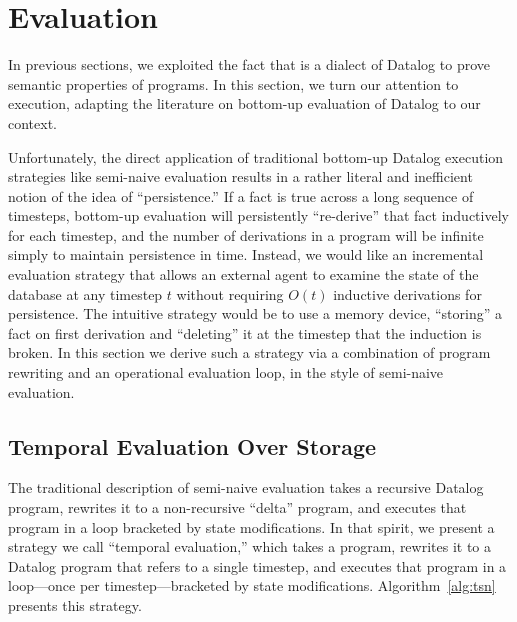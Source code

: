 \section{Evaluation}
In previous sections, we exploited the fact that \slang is a dialect of Datalog to prove semantic properties of \slang programs.  In this section, we turn our attention to execution, adapting the literature on bottom-up evaluation of Datalog to our context.

Unfortunately, the direct application of traditional bottom-up Datalog execution strategies like semi-naive evaluation results in a rather literal and inefficient notion of the idea of ``persistence.''  If a fact is true across a long sequence of timesteps, bottom-up evaluation will persistently ``re-derive'' that fact inductively for each timestep, and the number of derivations in a program will be infinite simply to maintain persistence in time.  Instead, we would like an incremental evaluation strategy that allows an external agent to examine the state of the database at any timestep $t$ without requiring $O(t)$ inductive derivations for persistence.  The intuitive strategy would be to use a memory device, ``storing'' a fact on first derivation and ``deleting'' it at the timestep that the induction is broken.  In this section we derive such a strategy via a combination of program rewriting and an operational evaluation loop, in the style of semi-naive evaluation.

\subsection{Temporal Evaluation Over Storage}
The traditional description of semi-naive evaluation takes a recursive Datalog program, rewrites it to a non-recursive ``delta'' program, and executes that program in a loop bracketed by state modifications.  In that spirit, we present a strategy we call ``temporal evaluation,'' which takes a \slang program, rewrites it to a Datalog program that refers to a single timestep, and executes that program in a loop---once per timestep---bracketed by state modifications.  Algorithm~\ref{alg:tsn} presents this strategy.


